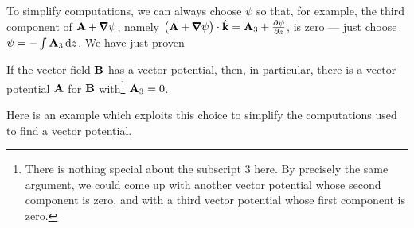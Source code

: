 To simplify computations, we can always choose $\psi$ so that, for example, 
the third component of $\vA+\vnabla\psi$, namely 
$\big(\vA+\vnabla\psi\big)\cdot\hk= \vA_3+\frac{\partial\psi}{\partial z}$,
is zero --- just choose $\psi = -\int \mathbf{A}_3\, \mathrm{d}z$. We have just proven
\begin{lemma}\label{lem:A3zero}
If the vector field $\mathbf{B}$ has a vector potential, then, in particular,
there is a vector potential $\mathbf{A}$ for $\mathbf{B}$ with\footnote{There is
nothing special about the subscript $3$ here. By precisely the same
argument, we could come up with another vector potential whose
second component is zero, and with a third vector potential whose
first component is zero.} $\mathbf{A}_3=0$.
\end{lemma}
\noindent
Here is an example which exploits this choice to simplify the 
computations used to find a vector potential. 

